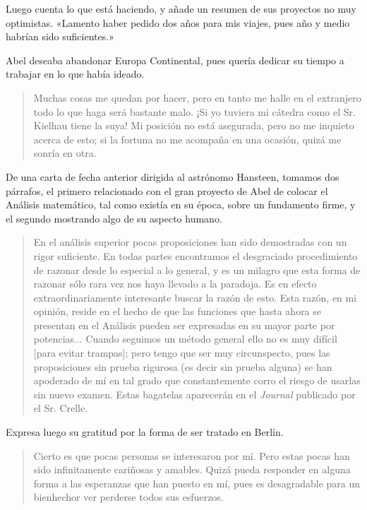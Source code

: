 \documentclass[a4paper, 12pt, draft]{article}
\begin{document}
Luego cuenta lo que está haciendo, y añade un resumen de sus proyectos no muy optimistas. «Lamento haber pedido dos años para mis viajes, pues año y medio habrían sido suficientes.»

Abel deseaba abandonar Europa Continental, pues quería dedicar su tiempo a trabajar en lo que había ideado.

\begin{quote}
\small
Muchas cosas me quedan por hacer, pero en tanto me halle en el extranjero todo lo que haga será bastante malo. ¡Si yo tuviera mi cátedra como el Sr. Kielhau tiene la suya! Mi posición no está asegurada, pero no me inquieto acerca de esto; si la fortuna no me acompaña en una ocasión, quizá me sonría en otra.


\end{quote}

De una carta de fecha anterior dirigida al astrónomo Hansteen, tomamos dos párrafos, el primero relacionado con el gran proyecto de Abel de colocar el Análisis matemático, tal como existía en su época, sobre un fundamento firme, y el segundo mostrando algo de su aspecto humano.

\begin{quote}\small

En el análisis superior pocas proposiciones han sido demostradas con un rigor suficiente. En todas partes encontramos el desgraciado procedimiento de razonar desde lo especial a lo general, y es un milagro que esta forma de razonar sólo rara vez nos haya llevado a la paradoja. Es en efecto extraordinariamente interesante buscar la razón de esto. Esta razón, en mi opinión, reside en el hecho de que las funciones que hasta ahora se presentan en el Análisis pueden ser expresadas en su mayor parte por potencias...  Cuando seguimos un método general ello no es muy difícil [para evitar trampas]; pero tengo que ser muy circunspecto, pues las proposiciones sin prueba rigurosa (es decir sin prueba alguna) se han apoderado de mí en tal grado que constantemente corro el riesgo de usarlas sin nuevo examen. Estas bagatelas aparecerán en el {\it Journal} publicado por el Sr. Crelle.

\end{quote}

Expresa luego su gratitud por la forma de ser tratado en Berlín.

\begin{quote}\small

Cierto es que pocas personas se interesaron por mí. Pero estas pocas han sido infinitamente cariñosas y amables. Quizá pueda responder en alguna forma a las esperanzas que han puesto en mí, pues es desagradable para un bienhechor ver perderse todos sus esfuerzos.

\end{quote}
\end{document}
